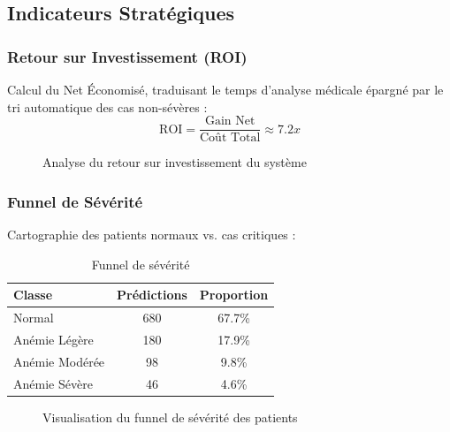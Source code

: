\documentclass[12pt,a4paper]{article}
\begin{document}
\subsection{Indicateurs Stratégiques}

\subsubsection{Retour sur Investissement (ROI)}
Calcul du Net Économisé, traduisant le temps d'analyse médicale épargné par le tri automatique des cas non-sévères :
\begin{equation}
\text{ROI} = \frac{\text{Gain Net}}{\text{Coût Total}} \approx 7.2x
\end{equation}

\begin{figure}[H]
\centering
{}
\caption{Analyse du retour sur investissement du système}
\label{fig:roi_analysis}
\end{figure}

\subsubsection{Funnel de Sévérité}
Cartographie des patients normaux vs. cas critiques :
\begin{table}[H]
\centering
\caption{Funnel de sévérité}
\label{tab:funnel}
\begin{tabular}{l c c}
\toprule
\textbf{Classe} & \textbf{Prédictions} & \textbf{Proportion} \\
\midrule
Normal & 680 & 67.7\% \\
Anémie Légère & 180 & 17.9\% \\
Anémie Modérée & 98 & 9.8\% \\
Anémie Sévère & 46 & 4.6\% \\
\bottomrule
\end{tabular}
\end{table}

\begin{figure}[H]
\centering
{}
\caption{Visualisation du funnel de sévérité des patients}
\label{fig:severity_funnel}
\end{figure}
\end{document}
